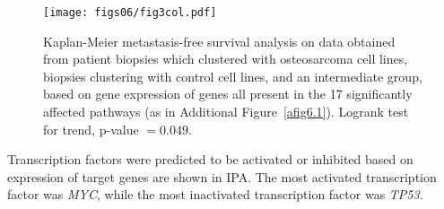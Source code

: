 \begin{figure}[htbp]
  \centering
  \begin{minipage}[b]{0.50\linewidth}
   \texttt{[image: figs06/fig3col.pdf]}	%
  \end{minipage}
    \hfill
  \begin{minipage}[b]{0.46\linewidth}
     \caption{Kaplan\hyp{}Meier metastasis\hyp{}free survival analysis on data obtained from patient biopsies which clustered with osteosarcoma cell lines, biopsies clustering with control cell lines, and an intermediate group, based on gene expression of genes all present in the 17 significantly affected pathways (as in Additional Figure~\ref{afig6.1}). Logrank test for trend, p-value $=0.049$.}
     \label{fig6.3}
     \end{minipage}
\end{figure}
%
Transcription factors were predicted to be activated or inhibited based on expression of target genes are shown in IPA. The most activated transcription factor was {\it MYC}, while the most inactivated transcription factor was {\it TP53}.

